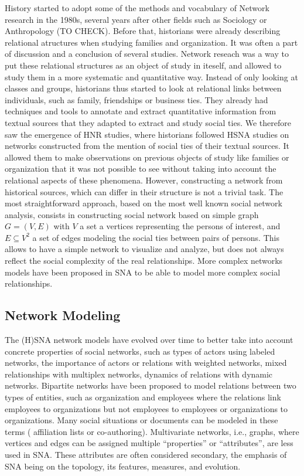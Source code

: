 History started to adopt some of the methods and vocabulary of Network research in the 1980s, several years after other fields such as Sociology or Anthropology (TO CHECK).
Before that, historians were already describing relational atructures when studying families and organization. It was often a part of discussion and a conclusion of several studies.
Network reseach was a way to put these relational structures as an object of study in iteself, and allowed to study them in a more systematic and quantitative way.
Instead of only looking at classes and groups, historians thus started to look at relational links between individuals, such as family, friendships or business ties.
They already had techniques and tools to annotate and extract quantitative information from textual sources that they adapted to extract and study social ties.
We therefore saw the emergence of HNR studies, where historians followed HSNA studies on networks constructed from the mention of social ties of their textual sources.
It allowed them to make observations on previous objects of study like families or organization that it was not possible to see without taking into account the relational aspects of these phenomena.
However, constructing a network from historical sources, which can differ in their structure is not a trivial task. The most straightforward approach, based on the most well known social network analysis, consists in constructing social network based on simple graph $G = (V, E)$ with $V$ a set a vertices representing the persons of interest, and $E \subseteq V^2$ a set of edges modeling the social ties between pairs of persons.
This allows to have a simple network to visualize and analyze, but does not always reflect the social complexity of the real relationships.
More complex networks models have been proposed in SNA to be able to model more complex social relationships.


\subsection{Network Modeling}

The (H)SNA network models have evolved over time to better take into account concrete properties of social networks, such as types of actors using labeled networks, the importance of actors or relations with weighted networks, mixed relationships with multiplex networks, dynamics of relations with dynamic networks.
Bipartite networks have been proposed to model relations between two types of entities, such as organization and employees where the relations link employees to organizations but not employees to employees or organizations to organizations. Many social situations or documents can be modeled in these terms (%
affiliation lists or co-authoring).
Multivariate networks, i.e.,  graphs, where vertices and edges can be assigned multiple ``properties'' or ``attributes'', are less used in SNA\@. These attributes are often considered secondary, the emphasis of SNA being on the topology, its features, measures, and evolution.

